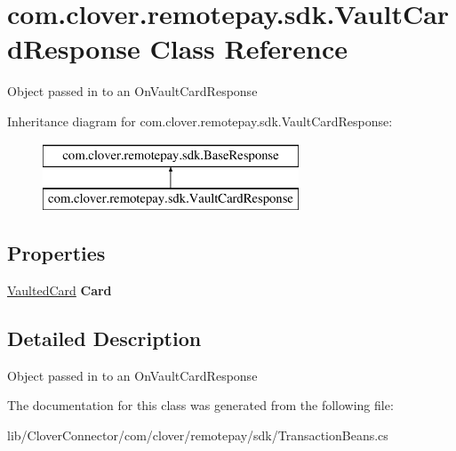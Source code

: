 \hypertarget{classcom_1_1clover_1_1remotepay_1_1sdk_1_1_vault_card_response}{}\section{com.\+clover.\+remotepay.\+sdk.\+Vault\+Card\+Response Class Reference}
\label{classcom_1_1clover_1_1remotepay_1_1sdk_1_1_vault_card_response}


Object passed in to an On\+Vault\+Card\+Response  


Inheritance diagram for com.\+clover.\+remotepay.\+sdk.\+Vault\+Card\+Response\+:\begin{figure}[H]
\begin{center}
\leavevmode
\includegraphics[height=2.000000cm]{classcom_1_1clover_1_1remotepay_1_1sdk_1_1_vault_card_response}
\end{center}
\end{figure}
\subsection*{Properties}
\begin{DoxyCompactItemize}
\item 
\mbox{\label{classcom_1_1clover_1_1remotepay_1_1sdk_1_1_vault_card_response_a10711fbd9fff70f8a7f98e45bcaaedbd}} 
\hyperlink{classcom_1_1clover_1_1sdk_1_1v3_1_1payments_1_1_vaulted_card}{Vaulted\+Card} {\bfseries Card}
\end{DoxyCompactItemize}


\subsection{Detailed Description}
Object passed in to an On\+Vault\+Card\+Response 



The documentation for this class was generated from the following file\+:\begin{DoxyCompactItemize}
\item 
lib/\+Clover\+Connector/com/clover/remotepay/sdk/Transaction\+Beans.\+cs\end{DoxyCompactItemize}
